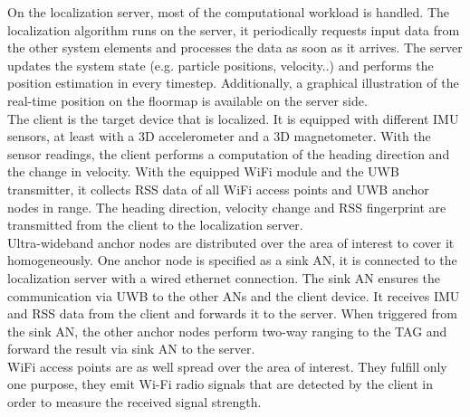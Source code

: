 \noindent\hspace*{5mm}%
On the localization server, most of the computational workload is handled. The localization algorithm runs on the server, it periodically requests input data from the other system elements and processes the data as soon as it arrives. The server updates the system state (e.g. particle positions, velocity..) and performs the position estimation in every timestep. Additionally, a graphical illustration of the real-time position on the floormap is available on the server side. \\
\noindent\hspace*{5mm}%
The client is the target device that is localized. It is equipped with different IMU sensors, at least with a 3D accelerometer and a 3D magnetometer. With the sensor readings, the client performs a computation of the heading direction and the change in velocity. With the equipped WiFi module and the UWB transmitter, it collects RSS data of all WiFi access points and UWB anchor nodes in range. The heading direction, velocity change and RSS fingerprint are transmitted from the client to the localization server.\\
\noindent\hspace*{5mm}%
Ultra-wideband anchor nodes are distributed over the area of interest to cover it homogeneously. One anchor node is specified as a sink AN, it is connected to the localization server with a wired ethernet connection. The sink AN ensures the communication via UWB to the other ANs and the client device. It receives IMU and RSS data from the client and forwards it to the server. When triggered from the sink AN, the other anchor nodes perform two-way ranging to the TAG and forward the result via sink AN to the server.\\
\noindent\hspace*{5mm}%
WiFi access points are as well spread over the area of interest. They fulfill only one purpose, they emit Wi-Fi radio signals that are detected by the client in order to measure the received signal strength. 


